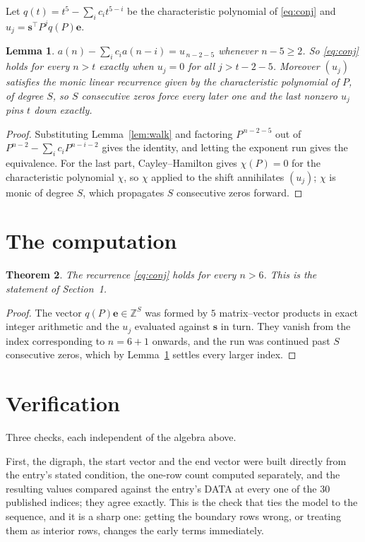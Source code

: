 \documentclass[11pt,a4paper]{article}
\theoremstyle{plain}
\newtheorem{theorem}{Theorem}
\newtheorem{lemma}[theorem]{Lemma}
\theoremstyle{definition}
\begin{document}
Let $q(t)=t^{5}-\sum_i c_i t^{5-i}$ be the characteristic polynomial of
\eqref{eq:conj} and $u_j=\mathbf{s}^{\!\top}P^{j}q(P)\mathbf{e}$.

\begin{lemma}\label{lem:crit}
$a(n)-\sum_i c_i a(n-i)=u_{\,n-2-5}$ whenever $n-5\ge2$. So \eqref{eq:conj}
holds for every $n>t$ exactly when $u_j=0$ for all $j>t-2-5$. Moreover $(u_j)$
satisfies the monic linear recurrence given by the characteristic polynomial of $P$, of
degree $S$, so $S$ consecutive zeros force every later one and the last nonzero $u_j$ pins
$t$ down exactly.
\end{lemma}

\begin{proof}
Substituting Lemma~\ref{lem:walk} and factoring $P^{\,n-2-5}$ out of
$P^{n-2}-\sum_i c_i P^{n-i-2}$ gives the identity, and letting the exponent run gives the
equivalence. For the last part, Cayley--Hamilton gives $\chi(P)=0$ for the characteristic
polynomial $\chi$, so $\chi$ applied to the shift annihilates $(u_j)$; $\chi$ is monic of
degree $S$, which propagates $S$ consecutive zeros forward.
\end{proof}

\section{The computation}

\begin{theorem}
The recurrence \eqref{eq:conj} holds for every $n>6$. This is the statement of
Section~1.
\end{theorem}

\begin{proof}
The vector $q(P)\mathbf{e}\in\mathbb{Z}^{S}$ was formed by $5$ matrix--vector
products in exact integer arithmetic and the $u_j$ evaluated against $\mathbf{s}$ in turn.
They vanish from the index corresponding to $n=6+1$ onwards, and the run was continued
past $S$ consecutive zeros, which by Lemma~\ref{lem:crit} settles every larger index.
\end{proof}

\section{Verification}

Three checks, each independent of the algebra above.

First, the digraph, the start vector and the end vector were built directly from the
entry's stated condition, the one-row count computed separately, and the resulting values
compared against the entry's DATA at every one of the $30$ published indices; they
agree exactly. This is the check that ties the model to the sequence, and it is a sharp one:
getting the boundary rows wrong, or treating them as interior rows, changes the early terms
immediately.
\end{document}
